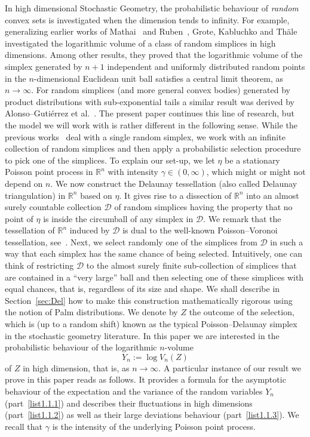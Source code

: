 \documentclass[AHL,Unicode,longabstracts,published]{cedram}
\newcommand{\R}{\mathbb{R}}
\newcommand{\dscr}{\mathcal{D}}
\begin{document}
In high dimensional Stochastic Geometry, the probabilistic behaviour of \emph{random} convex sets is investigated when the dimension tends to infinity. For example, generalizing earlier works of Mathai~\cite{Mathai82} and Ruben~\cite{Ruben77}, Grote, Kabluchko and Th\"ale~\cite{GKT17} investigated the logarithmic volume of a class of random simplices in high dimensions. Among other results, they proved that the logarithmic volume of the simplex generated by $n+1$ independent and uniformly distributed random points in the $n$-dimensional Euclidean unit ball satisfies a central limit theorem, as $n\to\infty$. For random simplices (and more general convex bodies) generated by product distributions with sub-exponential tails a similar result was derived by Alonso--Gutiérrez et al.~\cite{Oberwolfach}. The present paper continues this line of research, but the model we will work with is rather different in the following sense. While the previous works~\cite{Oberwolfach,GKT17,Mathai82,Ruben77} deal with a single random simplex, we work with an infinite collection of random simplices and then apply a probabilistic selection procedure to pick one of the simplices. To explain our set-up, we let $\eta$ be a stationary Poisson point process in $\R^n$ with intensity $\gamma\in(0,\infty)$, which might or might not depend on $n$. We now construct the Delaunay tessellation (also called Delaunay triangulation) in $\R^n$ based on $\eta$. It gives rise to a dissection of $\R^n$ into an almost surely countable collection $\dscr$ of random simplices having the property that no point of $\eta$ is inside the circumball of any simplex in $\dscr$. We remark that the tessellation of $\R^n$ induced by $\dscr$ is dual to the well-known Poisson--Voronoi tessellation, see~\cite[Section~10.2]{SW08}. Next, we select randomly one of the simplices from $\dscr$ in such a way that each simplex has the same chance of being selected. Intuitively, one can think of restricting $\dscr$ to the almost surely finite sub-collection of simplices that are contained in a ``very large'' ball and then selecting one of these simplices with equal chances, that is, regardless of its size and shape. We shall describe in Section~\ref{sec:Del} how to make this construction mathematically rigorous using the notion of Palm distributions. We denote by $Z$ the outcome of the selection, which is (up to a random shift) known as the typical Poisson--Delaunay simplex in the stochastic geometry literature. In this paper we are interested in the probabilistic behaviour of the logarithmic $n$-volume
\[
Y_n:=\log V_n(Z)
\]
of $Z$ in high dimension, that is, as $n\to\infty$. A particular instance of our result we prove in this paper reads as follows. It provides a formula for the asymptotic behaviour of the expectation and the variance of the random variables $Y_n$ (part~\eqref{list1.1.1}) and describes their fluctuations in high dimensions (part~\eqref{list1.1.2}) as well as their large deviations behaviour (part~\eqref{list1.1.3}). We recall that $\gamma$ is the intensity of the underlying Poisson point process.
\end{document}
